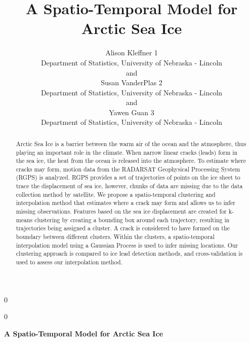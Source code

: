 \documentclass[12pt]{article}
\newcommand{\blind}{0}
\begin{document}
\def\spacingset#1{\renewcommand{\baselinestretch}%
{#1}\small\normalsize} \spacingset{1}



\blind
{
  \title{\bf A Spatio-Temporal Model for Arctic Sea Ice}

  \author{
        Alison Kleffner 1 \\
    Department of Statistics, University of Nebraska - Lincoln\\
     and \\     Susan VanderPlas 2 \\
    Department of Statistics, University of Nebraska - Lincoln\\
     and \\     Yawen Guan 3 \\
    Department of Statistics, University of Nebraska - Lincoln\\
      }
  \maketitle
} \fi

\blind
{
  \bigskip
  \bigskip
  \bigskip
  \begin{center}
    {\LARGE\bf A Spatio-Temporal Model for Arctic Sea Ice}
  \end{center}
  \medskip
} \fi

\bigskip
\begin{abstract}
Arctic Sea Ice is a barrier between the warm air of the ocean and the
atmosphere, thus playing an important role in the climate. When narrow
linear cracks (leads) form in the sea ice, the heat from the ocean is
released into the atmosphere. To estimate where cracks may form, motion
data from the RADARSAT Geophysical Processing System (RGPS) is analyzed.
RGPS provides a set of trajectories of points on the ice sheet to trace
the displacement of sea ice, however, chunks of data are missing due to
the data collection method by satellite. We propose a spatio-temporal
clustering and interpolation method that estimates where a crack may
form and allows us to infer missing observations. Features based on the
sea ice displacement are created for k-means clustering by creating a
bounding box around each trajectory, resulting in trajectories being
assigned a cluster. A crack is considered to have formed on the boundary
between different clusters. Within the clusters, a spatio-temporal
interpolation model using a Gaussian Process is used to infer missing
locations. Our clustering approach is compared to ice lead detection
methods, and cross-validation is used to assess our interpolation
method.
\end{abstract}
\end{document}
